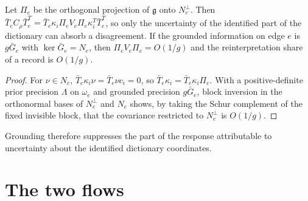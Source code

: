 \documentclass[11pt,letterpaper]{report}
\begin{document}
Let $\Pi_e$ be the orthogonal projection of $\mathfrak g$ onto $N_e^\perp$. Then $\bar T_eC_\rho\bar T_e^T=\bar T_e\kappa_i\Pi_eV_e\Pi_e\kappa_i^T\bar T_e^T$, so only the uncertainty of the identified part of the dictionary can absorb a disagreement. If the grounded information on edge $e$ is $g\bar G_e$ with $\ker\bar G_e=N_e$, then $\Pi_eV_e\Pi_e=O(1/g)$ and the reinterpretation share of a record is $O(1/g)$.
\begin{proof}
For $\nu\in N_e$, $\bar T_e\kappa_i\nu=\bar T_e\nu c_i=0$, so $\bar T_e\kappa_i=\bar T_e\kappa_i\Pi_e$. With a positive-definite prior precision $\Lambda$ on $\omega_e$ and grounded precision $g\bar G_e$, block inversion in the orthonormal bases of $N_e^\perp$ and $N_e$ shows, by taking the Schur complement of the fixed invisible block, that the covariance restricted to $N_e^\perp$ is $O(1/g)$.
\end{proof}

Grounding therefore suppresses the part of the response attributable to uncertainty about the identified dictionary coordinates.

\chapter{The two flows}
\label{it2:ch-flows}
\end{document}
